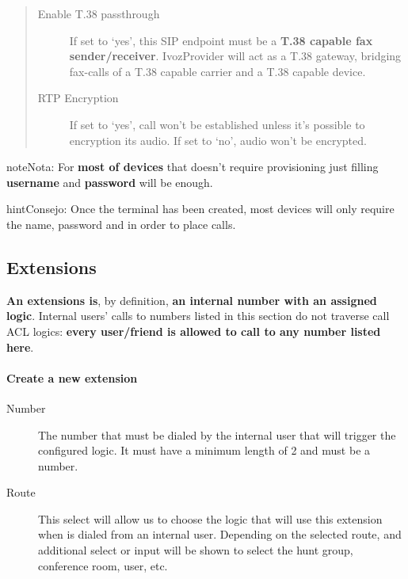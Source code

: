 \documentclass[letterpaper,10pt,spanish]{sphinxmanual}
\begin{document}
\begin{quote}
\begin{description}
\item[{Enable T.38 passthrough}] \leavevmode
If set to `yes', this SIP endpoint must be a \textbf{T.38 capable fax sender/receiver}. IvozProvider
will act as a T.38 gateway, bridging fax-calls of a T.38 capable carrier and a T.38 capable device.

\item[{RTP Encryption}] \leavevmode
If set to `yes', call won't be established unless it's possible to encryption its audio. If set to `no',
audio won't be encrypted.

\end{description}
\end{quote}

\begin{notice}{note}{Nota:}
For \textbf{most of devices} that doesn't require provisioning just
filling \textbf{username} and \textbf{password} will be enough.
\end{notice}

\begin{notice}{hint}{Consejo:}
Once the terminal has been created, most devices will only
require the name, password and {\hyperref[getting_started/internal_calls/brand_portal:domain\string-per\string-client]{}}
in order to place calls.
\end{notice}


\subsection{Extensions}
\label{administration_portal/client/vpbx/extensions:extensions}\label{administration_portal/client/vpbx/extensions::doc}\label{administration_portal/client/vpbx/extensions:id1}
\textbf{An extensions is}, by definition, \textbf{an internal number with an assigned
logic}. Internal users' calls to numbers listed in this section do not traverse
call ACL logics: \textbf{every user/friend is allowed to call to any number listed here}.
\paragraph{Create a new extension}
\begin{description}
\item[{Number}] \leavevmode
The number that must be dialed by the internal user that will trigger
the configured logic. It must have a minimum length of 2 and must be
a number.

\item[{Route}] \leavevmode
This select will allow us to choose the logic that will use this
extension when is dialed from an internal user. Depending on the selected
route, and additional select or input will be shown to select the
hunt group, conference room, user, etc.

\end{description}
\end{document}
